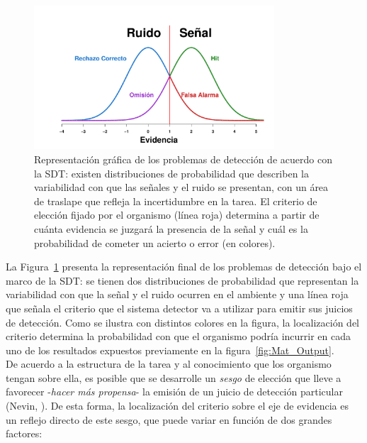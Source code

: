 \begin{figure}[bh]
\centering
\includegraphics[width=0.8\textwidth]{Figures/SDT_OutcomesR} 
\decoRule
\caption[Representación gráfica de las tareas de detección y los posibles resultados a obtener]{Representación gráfica de los problemas de detección de acuerdo con la SDT: existen distribuciones de probabilidad que describen la variabilidad con que las señales y el ruido se presentan, con un área de traslape que refleja la incertidumbre en la tarea. El criterio de elección fijado por el organismo (línea roja) determina a partir de cuánta evidencia se juzgará la presencia de la señal y cuál es la probabilidad de cometer un acierto o error (en colores).}
\label{fig:Graf_Outputs}
\end{figure}

La Figura~\ref{fig:Graf_Outputs} presenta la representación final de los problemas de detección bajo el marco de la SDT: se tienen dos distribuciones de probabilidad que representan la variabilidad con que la señal y el ruido ocurren en el ambiente y una línea roja que señala el criterio que el sistema detector va a utilizar para emitir sus juicios de detección. Como se ilustra con distintos colores en la figura, la localización del criterio determina la probabilidad con que el organismo podría incurrir en cada uno de los resultados expuestos previamente en la figura~\ref{fig:Mat_Output}.\\

De acuerdo a la estructura de la tarea y al conocimiento que los organismo tengan sobre ella, es posible que se desarrolle un \textit{sesgo} de elección que lleve a favorecer -\textit{hacer más propensa}- la emisión de un juicio de detección particular (Nevin, \citeyear{Nevin1969}). De esta forma, la localización del criterio sobre el eje de evidencia es un reflejo directo de este sesgo, que puede variar en función de dos grandes factores:\\

